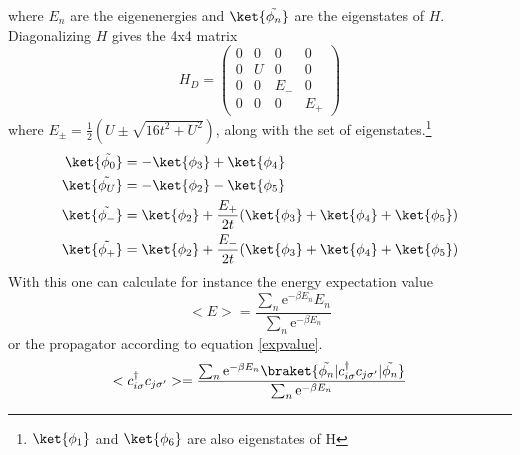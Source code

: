 where $E_n$ are the eigenenergies and $\ket{\tilde{\phi_n}}$ are the eigenstates of $H$. Diagonalizing $H$ gives the 4x4 matrix 
\begin{equation*}
H_D=
\begin{pmatrix}
0 & 0 & 0&0\\
0 & U & 0&0\\
0 & 0 & E_{-}&0\\
0 & 0 & 0&E_{+}
\end{pmatrix}
\end{equation*}
where $E_{\pm}=\frac{1}{2}(U\pm\sqrt{16t^2+U^2})$, along with the set of eigenstates.\footnote{$\ket{\phi_1}$ and $\ket{\phi_6}$ are also eigenstates of H}
\begin{align*}
	\ket{\tilde{\phi_{0}}}&=-\ket{\phi_3}+\ket{\phi_4}\\
	\ket{\tilde{\phi_{U}}}&=-\ket{\phi_2} - \ket{\phi_5}	\\
	\ket{\tilde{\phi_{-}}}&=\ket{\phi_2}+\frac{E_+}{2t}(\ket{\phi_3}+\ket{\phi_4}+\ket{\phi_5})	\\
	\ket{\tilde{\phi_{+}}}&=\ket{\phi_2}+\frac{E_-}{2t}(\ket{\phi_3}+\ket{\phi_4}+\ket{\phi_5})	
\end{align*}
With this one can calculate for instance the energy expectation value 
\begin{equation}
	<E>  = \frac{\sum_{n}^{}\text{e}^{-\beta E_n}E_n}{\sum_{n}^{}\text{e}^{-\beta E_n}}
\end{equation}
or the propagator according to equation \ref{expvalue}.
\begin{equation}
	<c^{\dagger}_{i\sigma}c_{j\sigma^{\prime}}>= \frac{\sum_{n}^{}\text{e}^{-\beta E_n}\braket{\tilde{\phi_n}|c^{\dagger}_{i\sigma}c_{j\sigma^{\prime}}|\tilde{\phi_n}}}{\sum_{n}^{}\text{e}^{-\beta E_n}}
\end{equation}


